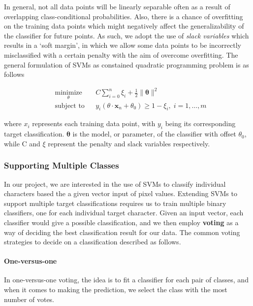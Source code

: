 \documentclass[12pt]{article}
\begin{document}
	In general, not all data points will be linearly separable often as a result of overlapping class-conditional probabilities. Also, there is a chance of overfitting on the training data points which might negatively affect the generalizability of the classifier for future points. As such, we adopt the use of \textit{slack variables} which results in a `soft margin', in which we allow some data points to be incorrectly misclassified with a certain penalty with the aim of overcome overfitting. The general formulation of SVMs as constained quadratic programming problem is as follows

	\begin{equation*}
	\label{equation:svm}
	\begin{aligned}
	& \underset{\theta}{\text{minimize}}
	& & C\sum_{i=0}^n\xi_{i} + \frac{1}{2} \parallel\mathbf{\theta}\parallel^{2}  \\
	& \text{subject to}
	& & y_{i}(\theta\cdot\mathbf{x}_{n}+\theta_{0}) \ge 1 - \xi_{i}, \; i = 1, \ldots, m
	\end{aligned}
	\end{equation*}

	where $x_{i}$ represents each training data point, with $y_{i}$ being its corresponding target classification. $\mathbf{\theta}$ is the model, or parameter, of the classifier with offset $\theta_{0}$, while C and $\xi$ represent the penalty and slack variables respectively.
	
	\subsubsection{Supporting Multiple Classes}
	In our project, we are interested in the use of SVMs to classify individual characters based the a given vector input of pixel values. Extending SVMs to support multiple target classifications requires us to train multiple binary classifiers, one for each individual target character. Given an input vector, each classifier would give a possible classification, and we then employ \textbf{voting} as a way of deciding the best classification result for our data. The common voting strategies to decide on a classification described as follows.

	\paragraph{One-versus-one}
	In one-versus-one voting, the idea is to fit a classifier for each pair of classes, and when it comes to making the prediction, we select the class with the most number of votes. 
		
\end{document}
